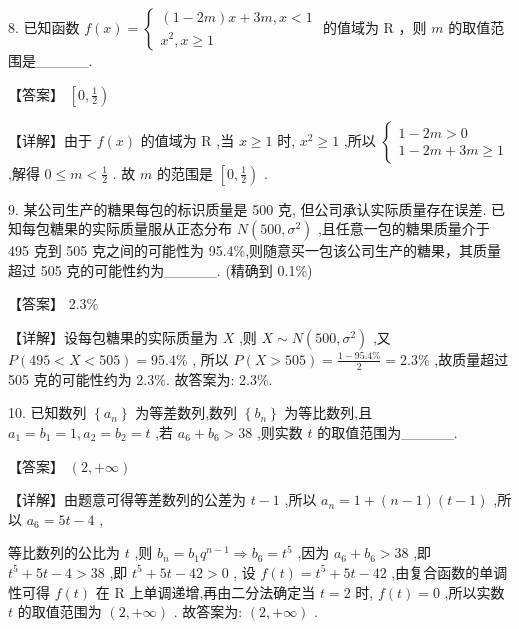 \documentclass[10pt]{article}
\begin{document}
8. 已知函数 \(f\left( x\right)  = \left\{  \begin{array}{l} \left( {1 - {2m}}\right) x + {3m},x < 1 \\  {x}^{2},x \geq  1 \end{array}\right.\) 的值域为 \(\mathrm{R}\) ，则 \(m\) 的取值范围是\_\_\_\_\_.

【答案】 \(\left\lbrack  {0,\frac{1}{2}}\right)\)

【详解】由于 \(f\left( x\right)\) 的值域为 \(\mathrm{R}\) ,当 \(x \geq  1\) 时, \({x}^{2} \geq  1\) ,所以 \(\left\{  \begin{array}{l} 1 - {2m} > 0 \\  1 - {2m} + {3m} \geq  1 \end{array}\right.\) ,解得 \(0 \leq  m < \frac{1}{2}\) . 故 \(m\) 的范围是 \(\left\lbrack  {0,\frac{1}{2}}\right)\) .

9. 某公司生产的糖果每包的标识质量是 500 克, 但公司承认实际质量存在误差. 已知每包糖果的实际质量服从正态分布 \(N\left( {{500},{\sigma }^{2}}\right)\) ,且任意一包的糖果质量介于 495 克到 505 克之间的可能性为 95.4\%,则随意买一包该公司生产的糖果，其质量超过 505 克的可能性约为\_\_\_\_\_. (精确到 0.1\%)

【答案】 2.3\%

【详解】设每包糖果的实际质量为 \(X\) ,则 \(X \sim  N\left( {{500},{\sigma }^{2}}\right)\) ,又 \(P\left( {{495} < X < {505}}\right)  = {95.4}\%\) , 所以 \(P\left( {X > {505}}\right)  = \frac{1 - {95.4}\% }{2} = {2.3}\%\) ,故质量超过 505 克的可能性约为 2.3\%. 故答案为: 2.3\%.

10. 已知数列 \(\left\{  {a}_{n}\right\}\) 为等差数列,数列 \(\left\{  {b}_{n}\right\}\) 为等比数列,且 \({a}_{1} = {b}_{1} = 1,{a}_{2} = {b}_{2} = t\) ,若 \({a}_{6} + {b}_{6} > {38}\) ,则实数 \(t\) 的取值范围为\_\_\_\_\_.

【答案】 \(\left( {2, + \infty }\right)\)

【详解】由题意可得等差数列的公差为 \(t - 1\) ,所以 \({a}_{n} = 1 + \left( {n - 1}\right) \left( {t - 1}\right)\) ,所以 \({a}_{6} = {5t} - 4\) ,

等比数列的公比为 \(t\) ,则 \({b}_{n} = {b}_{1}{q}^{n - 1} \Rightarrow  {b}_{6} = {t}^{5}\) ,因为 \({a}_{6} + {b}_{6} > {38}\) ,即 \({t}^{5} + {5t} - 4 > {38}\) ,即 \({t}^{5} + {5t} - {42} > 0\) , 设 \(f\left( t\right)  = {t}^{5} + {5t} - {42}\) ,由复合函数的单调性可得 \(f\left( t\right)\) 在 \(\mathrm{R}\) 上单调递增,再由二分法确定当 \(t = 2\) 时, \(f\left( t\right)  = 0\) ,所以实数 \(t\) 的取值范围为 \(\left( {2, + \infty }\right)\) . 故答案为: \(\left( {2, + \infty }\right)\) .
\end{document}
